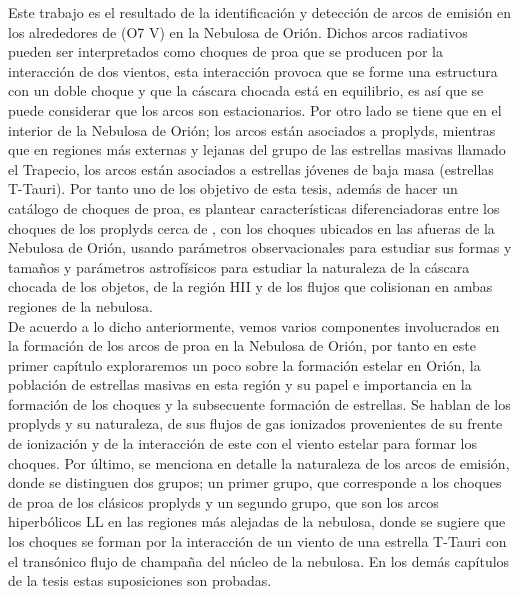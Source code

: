% 


% 

\label{chap:introduction}

Este trabajo es el resultado de la identificación y detección de arcos de emisión en los alrededores de \thC{} (O7 V) en la Nebulosa de Orión. Dichos arcos radiativos pueden ser interpretados como choques de proa que se producen por la interacción de dos vientos, esta interacción provoca que se forme una estructura con un doble choque y que la cáscara chocada está en equilibrio, es así que se puede considerar que los arcos son estacionarios. Por otro lado se tiene que en el interior de la Nebulosa de Orión; los arcos están asociados a proplyds, mientras que en regiones más externas y lejanas del grupo de las estrellas masivas llamado el Trapecio, los arcos están asociados a estrellas jóvenes de baja masa (estrellas T-Tauri). Por tanto uno de los objetivo de esta tesis, además de hacer un catálogo de choques de proa, es plantear características diferenciadoras entre los choques de los proplyds cerca de \thC{}, con los choques ubicados en las afueras de la Nebulosa de Orión, usando parámetros observacionales para estudiar sus formas y tamaños y parámetros astrofísicos para estudiar la naturaleza de la cáscara chocada de los objetos, de la región HII y de los flujos que colisionan en ambas regiones de la nebulosa. \\

De acuerdo a lo dicho anteriormente, vemos varios componentes involucrados en la formación de los arcos de proa en la Nebulosa de Orión, por tanto en este primer capítulo exploraremos un poco sobre la formación estelar en Orión, la población de estrellas masivas en esta región y su papel e importancia en la formación de los choques y la subsecuente formación de estrellas. Se hablan de los proplyds y su naturaleza, de sus flujos de gas ionizados provenientes de su frente de ionización y de la interacción de este con el viento estelar para formar los choques. Por último, se menciona en detalle la naturaleza de los arcos de emisión, donde se distinguen dos grupos; un primer grupo, que corresponde a los choques de proa de los clásicos proplyds y un segundo grupo, que son los arcos hiperbólicos LL en las regiones más alejadas de la nebulosa, donde se sugiere que los choques se forman por la interacción de un viento de una estrella T-Tauri con el transónico flujo de champaña del núcleo de la nebulosa. En los demás capítulos de la tesis estas suposiciones son probadas.                

